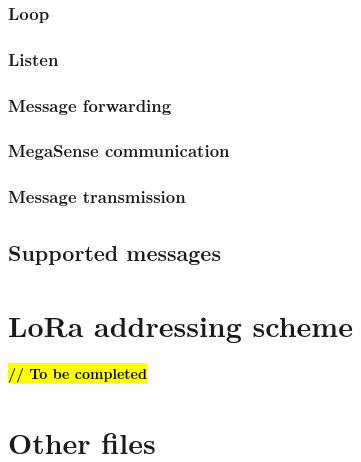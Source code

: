 			
			\subsubsection{Loop}
			
			\subsubsection{Listen}
			
			\subsubsection{Message forwarding}
			
			\subsubsection{MegaSense communication}
			
			\subsubsection{Message transmission}
			
		\subsection{Supported messages}
		
	\section{LoRa addressing scheme}\label{subsec:lora_addressing}

		\textbf{\textcolor{red}{\hl{// To be completed}}}
		
		
		
		
	\section{Other files}
	
		
